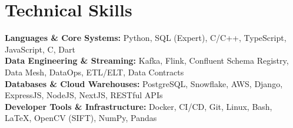 \medskip

\resumeItemListStart
{}
\resumeItemListEnd
\resumeItemListEnd

\resumeSubHeadingListEnd

\section{Technical Skills}
\begin{itemize}[leftmargin=0.15in, label={}]
  \small{\item{
        \textbf{Languages \& Core Systems:} {Python, SQL (Expert), C/C++, TypeScript, JavaScript, C, Dart} \\
        \textbf{Data Engineering \& Streaming:} {Kafka, Flink, Confluent Schema Registry, Data Mesh, DataOps, ETL/ELT, Data Contracts} \\
        \textbf{Databases \& Cloud Warehouses:} {PostgreSQL, Snowflake, AWS, Django, ExpressJS, NodeJS, NextJS, RESTful APIs} \\
        \textbf{Developer Tools \& Infrastructure:} {Docker, CI/CD, Git, Linux, Bash, \LaTeX, OpenCV (SIFT), NumPy, Pandas} \\
        }}
\end{itemize}
